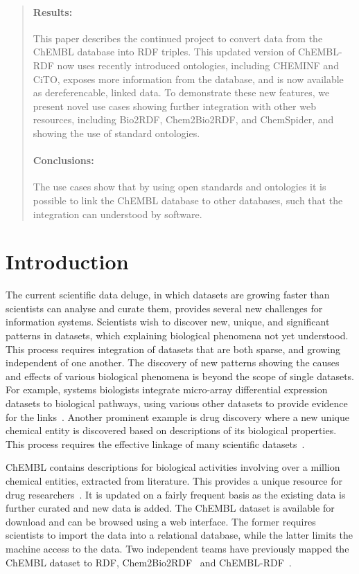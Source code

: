 \documentclass[10pt]{bmc_article}
\newenvironment{bmcformat}{\begin{raggedright}\baselineskip20pt\sloppy\setboolean{publ}{false}}{\end{raggedright}\baselineskip20pt\sloppy}
\begin{document}
\begin{bmcformat}
\begin{abstract}
\paragraph*{Results:}
This paper describes the continued project to convert data from the ChEMBL database into RDF triples.
This updated version of ChEMBL-RDF now uses recently introduced ontologies, including CHEMINF and CiTO,
exposes more information from the database, and is now available as dereferencable, linked data.
To demonstrate these new features, we present novel use cases showing further integration with
other web resources, including Bio2RDF, Chem2Bio2RDF, and ChemSpider, and showing the use of standard
ontologies.
\paragraph*{Conclusions:}
The use cases show that by using open standards and ontologies it is possible to link the ChEMBL database
to other databases, such that the integration can understood by software. 
\end{abstract}



\section*{Introduction}\label{s1}


The current scientific data deluge, in which datasets are growing faster than scientists can analyse and 
curate them, provides several new challenges for information systems. Scientists wish to 
discover new, unique, and significant patterns in datasets, which explaining biological 
phenomena not yet understood. This process requires integration of datasets that are both 
sparse, and growing independent of one another. The discovery of new patterns showing the 
causes and effects of various biological phenomena is beyond the scope of single datasets.
For example, systems biologists integrate micro-array differential expression datasets to 
biological pathways, using various other datasets to provide evidence for the links~\cite{Staab2007}. 
Another prominent example is drug discovery where a new unique chemical entity is discovered 
based on descriptions of its biological properties. This process requires the effective 
linkage of many scientific datasets~\cite{Samwald2011,OpenPHACTS}.

ChEMBL contains descriptions for biological activities involving over a million chemical 
entities, extracted from literature. This provides a unique resource for drug researchers~\cite{Gaulton2012,Warr2009}.
It is updated on a fairly frequent basis as the existing data is further curated and new data is added. 
The ChEMBL dataset is available for download and can be browsed using a web interface. 
The former requires scientists to import the data into a relational database, while the 
latter limits the machine access to the data. Two independent teams have previously mapped 
the ChEMBL dataset to RDF, Chem2Bio2RDF~\cite{Chen2010} and ChEMBL-RDF~\cite{Willighagen2011}.


\end{bmcformat}
\end{document}
